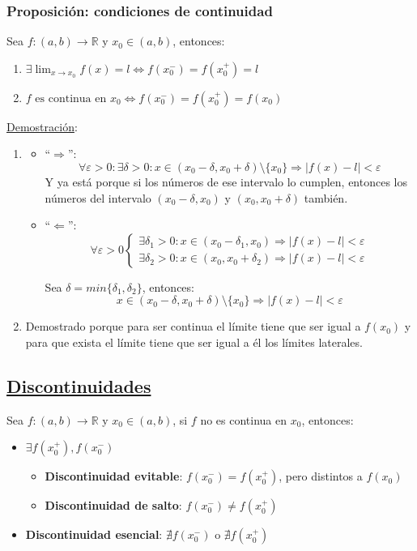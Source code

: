 \documentclass[10pt,a4paper,openright]{book}
\begin{document}
\subsubsection*{Proposición: condiciones de continuidad}
Sea $f: (a,b)\longrightarrow \mathbb R$ y $x_0\in (a,b)$, entonces:
\begin{enumerate}
\item $\exists \lim_{x\rightarrow x_0} f(x)=l\Leftrightarrow f(x_0^-)=f(x_0^+)=l$

\item $f \mbox{ es continua en }x_0 \Leftrightarrow f(x_0^-)=f(x_0^+)=f(x_0)$
\end{enumerate}

\underline{Demostración}:
\begin{enumerate}
\item 
	\begin{itemize}
	\item ``$\Rightarrow $'':
	$$\forall\varepsilon>0: \exists \delta>0: x\in (x_0-\delta, x_0+\delta)\mbox{\textbackslash}\{x_0\}\Rightarrow |f(x)-l|<\varepsilon$$
	Y ya está porque si los números de ese intervalo lo cumplen, entonces los números del intervalo $(x_0-\delta, x_0)$ y $(x_0, x_0+\delta)$ también.
	
	\item ``$\Leftarrow$'':
	$$\forall \varepsilon>0\begin{cases}\exists \delta_1>0: x\in (x_0-\delta_1, x_0)\Rightarrow |f(x)-l|<\varepsilon \\
	\exists \delta_2>0: x\in (x_0,x_0+\delta_2)\Rightarrow |f(x)-l|<\varepsilon\end{cases}$$
	
 	Sea $\delta =min\{ \delta_1, \delta_2\}$, entonces:
	$$x\in (x_0-\delta, x_0+\delta)\mbox{\textbackslash}\{x_0\}\Rightarrow |f(x)-l|<\varepsilon$$
	\end{itemize}
	
\item Demostrado porque para ser continua el límite tiene que ser igual a $f(x_0)$ y para que exista el límite tiene que ser igual a él los límites laterales.
\end{enumerate}

\subsection*{\underline{Discontinuidades}}
Sea $f: (a,b)\longrightarrow \mathbb R$ y $x_0\in (a,b)$, si $f$ no es continua en $x_0$, entonces:
\begin{itemize}
\item $\exists f(x_0^+), f(x_0^-)$
	\begin{itemize}
	\item \textbf{Discontinuidad evitable}: $f(x_0^-)=f(x_0^+)$, pero distintos a $f(x_0)$
	\item \textbf{Discontinuidad de salto}: $f(x_0^-)\neq f(x_0^+)$
	\end{itemize}

\item \textbf{Discontinuidad esencial}: $\nexists f(x_0^-)$ o $\nexists f(x_0^+)$
\end{itemize}
\end{document}
